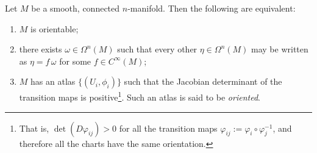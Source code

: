 \begin{proposition}\label{prop:orientable}
	Let $M$ be a smooth, connected $n$-manifold.
	Then the following are equivalent:
	\begin{enumerate}
		\item $M$ is orientable;
		\item there exists $\omega\in\Omega^n(M)$ such that every other $\eta\in\Omega^n(M)$ may be written as $\eta = f\,\omega$ for some $f\in C^\infty(M)$;
		\item $M$ has an atlas $\{(U_i, \phi_i)\}$ such that the Jacobian determinant of the transition maps is positive\footnote{That is, $\det(D\varphi_{ij}) > 0$ for all the transition maps $\varphi_{ij} := \varphi_i\circ\varphi_j^{-1}$, and therefore all the charts have the same orientation.}. Such an atlas is said to be \emph{oriented}.
	\end{enumerate}
\end{proposition}
